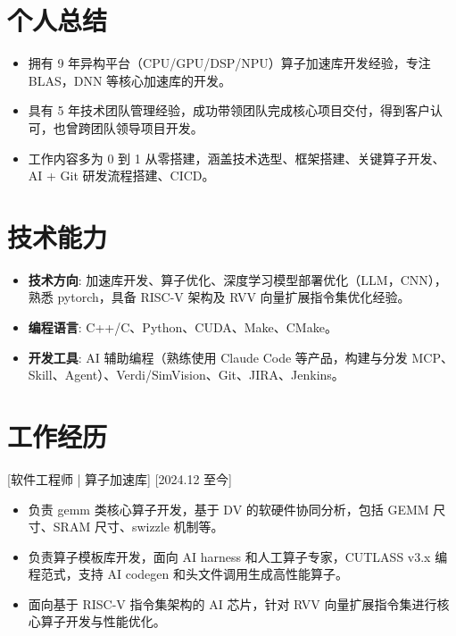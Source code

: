 \documentclass{resume}
\begin{document}


\ResumeTitle

\section{个人总结}
\begin{itemize}
    \item 拥有 9 年异构平台（CPU/GPU/DSP/NPU）算子加速库开发经验，专注 BLAS，DNN 等核心加速库的开发。
    \item 具有 5 年技术团队管理经验，成功带领团队完成核心项目交付，得到客户认可，也曾跨团队领导项目开发。
    \item 工作内容多为 0 到 1 从零搭建，涵盖技术选型、框架搭建、关键算子开发、AI + Git 研发流程搭建、CICD。
\end{itemize}

\section{技术能力}
\begin{itemize}
    \item \textbf{技术方向}: 加速库开发、算子优化、深度学习模型部署优化（LLM，CNN），熟悉 pytorch，具备 RISC-V 架构及 RVV 向量扩展指令集优化经验。
    \item \textbf{编程语言}: C++/C、Python、CUDA、Make、CMake。
    \item \textbf{开发工具}: AI 辅助编程（熟练使用 Claude Code 等产品，构建与分发 MCP、Skill、Agent）、Verdi/SimVision、Git、JIRA、Jenkins。
\end{itemize}


\section{工作经历}


[软件工程师 | 算子加速库]
[2024.12 至今]
\begin{itemize}
    \item 负责 gemm 类核心算子开发，基于 DV 的软硬件协同分析，包括 GEMM 尺寸、SRAM 尺寸、swizzle 机制等。
    \item 负责算子模板库开发，面向 AI harness 和人工算子专家，CUTLASS v3.x 编程范式，支持 AI codegen 和头文件调用生成高性能算子。
    \item 面向基于 RISC-V 指令集架构的 AI 芯片，针对 RVV 向量扩展指令集进行核心算子开发与性能优化。
\end{itemize}
\end{document}
